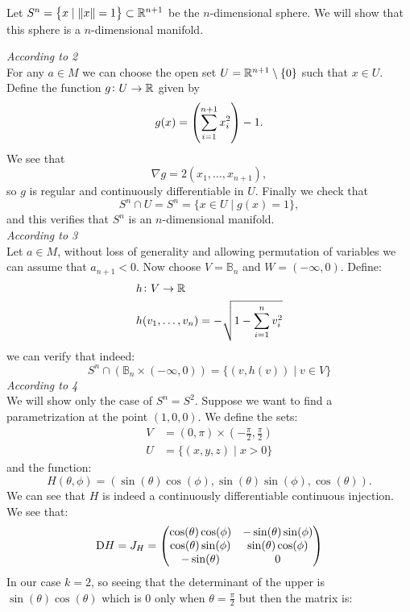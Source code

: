 \documentclass[11pt,a4paper]{article}
\begin{document}
\begin{example}
  Let $S^n = \left\{x \mid \left\lVert x\right\rVert = 1\right\} \subset \mathbb{R}^{n+1}$
  be the $n$-dimensional sphere.
  We will show that this sphere is a $n$-dimensional manifold.
\end{example}
\noindent
\emph{According to 2} \\
For any $a \in M$ we can choose the open set 
$U = \mathbb{R}^{n+1} \setminus \{0\}$ such that $x \in U$.
Define the function $g \colon U \to \mathbb{R}$ given by
\[
  g(x) = \del{\sum_{i=1}^{n+1} x_i^2} - 1.
\]
We see that
\[
  \nabla g = 2(x_1,\dots,x_{n+1}),
\]
so $g$ is regular and continuously differentiable in $U$.
Finally we check that
\[
  S^n \cap U = S^n = \{x \in U \mid g(x) = 1\},
\]
and this verifies that $S^n$ is an $n$-dimensional manifold. \\
\noindent
\emph{According to 3} \\
Let $a \in M$, without loss of generality and allowing permutation
of variables we can assume that $a_{n+1} < 0$. Now choose 
$V = \mathbb{B}_n$ and $W = (-\infty,0)$. Define:
\begin{align*}
  &h \colon V \to \mathbb{R} \\
  &h(v_1,\dots,v_n) = - \sqrt{1 - \sum_{i=1}^{n}{v_i^2}}
\end{align*}
we can verify that indeed:
\[
  S^n \cap (\mathbb{B}_n \times (-\infty,0)) = \{(v,h(v)) \mid v \in V\}
\]
\emph{According to 4} \\
We will show only the case of $S^n = S^2$.
Suppose we want to find a parametrization at the point $(1,0,0)$.
We define the sets:
\begin{align*}
  V &= (0,\pi) \times \left(-\frac{\pi}{2}, \frac{\pi}{2}\right) \\
  U &= \{(x,y,z) \mid x > 0\}
\end{align*}
and the function:
\[
  H(\theta, \phi) = 
  (\sin(\theta)\cos(\phi),\sin(\theta)\sin(\phi),\cos(\theta)).
\]
We can see that $H$ is indeed a continuously differentiable continuous
injection. We see that:
\[
  \mathrm{D} H = J_H = \begin{pmatrix}
        \cos(\theta)\cos(\phi) & -\sin(\theta)\sin(\phi)\\
        \cos(\theta)\sin(\phi) & \sin(\theta)\cos(\phi)\\
        -\sin(\theta) & 0\\
        \end{pmatrix}
\]
In our case $k = 2$, so seeing that the determinant of the upper
is $\sin(\theta)\cos(\theta)$ which is $0$ only when 
$\theta = \frac{\pi}{2}$ but then the matrix is:
\end{document}
